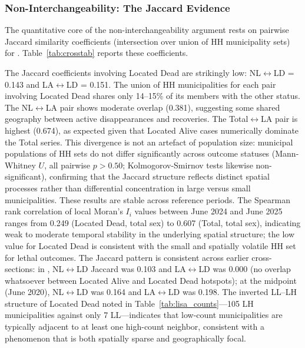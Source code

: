 \subsubsection{Non-Interchangeability: The Jaccard Evidence}
The quantitative core of the non-interchangeability argument rests on pairwise Jaccard similarity coefficients (intersection over union of HH municipality sets) for .
Table~\ref{tab:crosstab} reports these coefficients.

The Jaccard coefficients involving Located Dead are strikingly low: NL$\leftrightarrow$LD = 0.143 and LA$\leftrightarrow$LD = 0.151.
The union of HH municipalities for each pair involving Located Dead shares only 14--15\% of its members with the other status.
The NL$\leftrightarrow$LA pair shows moderate overlap (0.381), suggesting some shared geography between active disappearances and recoveries.
The Total$\leftrightarrow$LA pair is highest (0.674), as expected given that Located Alive cases numerically dominate the Total series.
This divergence is not an artefact of population size: municipal populations of HH sets do not differ significantly across outcome statuses (Mann-Whitney $U$, all pairwise $p > 0.50$; Kolmogorov-Smirnov tests likewise non-significant), confirming that the Jaccard structure reflects distinct spatial processes rather than differential concentration in large versus small municipalities.
These results are stable across reference periods.
The Spearman rank correlation of local Moran's $I_i$ values between June 2024 and June 2025 ranges from 0.249 (Located Dead, total sex) to 0.607 (Total, total sex), indicating weak to moderate temporal stability in the underlying spatial structure; the low value for Located Dead is consistent with the small and spatially volatile HH set for lethal outcomes.
The Jaccard pattern is consistent across earlier cross-sections: in \bookendstart{}, NL$\leftrightarrow$LD Jaccard was 0.103 and LA$\leftrightarrow$LD was 0.000 (no overlap whatsoever between Located Alive and Located Dead hotspots); at the midpoint (June 2020), NL$\leftrightarrow$LD was 0.164 and LA$\leftrightarrow$LD was 0.198.
The inverted LL--LH structure of Located Dead noted in Table~\ref{tab:lisa_counts}---105 LH municipalities against only 7 LL---indicates that low-count municipalities are typically adjacent to at least one high-count neighbor, consistent with a phenomenon that is both spatially sparse and geographically focal.